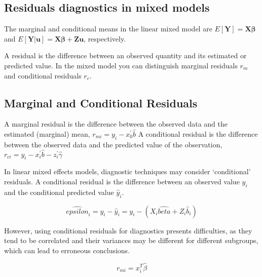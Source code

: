 \documentclass[Main.tex]{subfiles}
\begin{document}


\subsection{Residuals diagnostics in mixed models}


The marginal and conditional means in the linear mixed model are
$E[\boldsymbol{Y}] = \boldsymbol{X}\boldsymbol{\beta}$ and
$E[\boldsymbol{Y|\boldsymbol{u}}] = \boldsymbol{X}\boldsymbol{\beta} + \boldsymbol{Z}\boldsymbol{u}$, respectively.


A residual is the difference between an observed quantity and its estimated or predicted value. In the mixed
model you can distinguish marginal residuals $r_m$ and conditional residuals $r_c$.




\subsection{Marginal and Conditional Residuals}


A marginal residual is the difference between the observed data and the estimated (marginal) mean, $r_{mi} = y_i - x_0^{\prime} \hat{b}$
A conditional residual is the difference between the observed data and the predicted value of the observation,
$r_{ci} = y_i - x_i^{\prime} \hat{b} - z_i^{\prime} \hat{\gamma}$


In linear mixed effects models, diagnostic techniques may consider `conditional' residuals. A conditional residual is the difference between an observed value $y_{i}$ and the conditional predicted value $\hat{y}_{i} $.


\[ \hat{epsilon}_{i} = y_{i} - \hat{y}_{i} = y_{i} - ( X_{i}\hat{beta} + Z_{i}\hat{b}_{i}) \]


However, using conditional residuals for diagnostics presents difficulties, as they tend to be correlated and their variances may be different for different subgroups, which can lead to erroneous conclusions.














\begin{equation}
r_{mi}=x^{T}_{i}\hat{\beta}
\end{equation}
\end{document}

